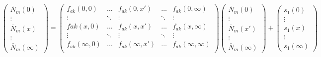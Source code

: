 \documentclass{article}
\begin{document}
	\begin{equation}\label{eq:8}
		\begin{pmatrix}
			\overline{N}_m(0)\\ \vdots\\ \overline{N}_m(x)\\ \vdots \\ \overline{N}_m(\infty)
		\end{pmatrix}
		=
		\begin{pmatrix}
			f_{ak}(0,0)&\dots&f_{ak}(0,x')&\dots&f_{ak}(0,\infty)\\
			\vdots&\ddots&\vdots&\ddots&\vdots\\
			f{ak}(x,0)&\dots&f_{ak}(x,x')&\dots&f_{ak}(x,\infty)\\
			\vdots&\ddots&\vdots&\ddots&\vdots\\
			f_{ak}(\infty,0)&\dots&f_{ak}(\infty,x')&\dots&f_{ak}(\infty,\infty)\\
		\end{pmatrix}
		\begin{pmatrix}
			\overline{N}_m(0)\\ \vdots\\ \overline{N}_m(x')\\ \vdots \\ \overline{N}_m(\infty)
		\end{pmatrix}
		+
		\begin{pmatrix}
			s_1(0)\\ \vdots\\s_1(x)\\ \vdots\\s_1(\infty)
		\end{pmatrix}
	\end{equation}
\end{document}
